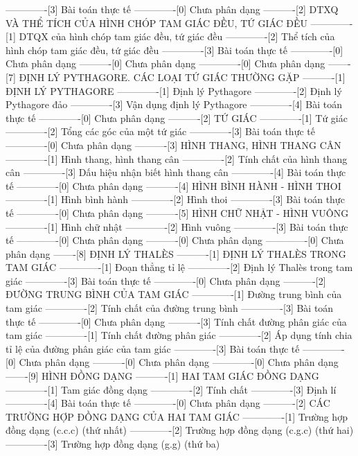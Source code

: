 -------------[3] Bài toán thực tế
-------------[0] Chưa phân dạng
----------[2] DTXQ VÀ THỂ TÍCH CỦA HÌNH CHÓP TAM GIÁC ĐỀU, TỨ GIÁC ĐỀU
-------------[1] DTQX của hình chóp tam giác đều, tứ giác đều
-------------[2] Thể tích của hình chóp tam giác đều, tứ giác đều
-------------[3] Bài toán thực tế
-------------[0] Chưa phân dạng
----------[0] Chưa phân dạng
-------------[0] Chưa phân dạng
-------[7] ĐỊNH LÝ PYTHAGORE. CÁC LOẠI TỨ GIÁC THƯỜNG GẶP
----------[1] ĐỊNH LÝ PYTHAGORE
-------------[1] Định lý Pythagore
-------------[2] Định lý Pythagore đảo
-------------[3] Vận dụng định lý Pythagore
-------------[4] Bài toán thực tế
-------------[0] Chưa phân dạng
----------[2] TỨ GIÁC
-------------[1] Tứ giác
-------------[2] Tổng các góc của một tứ giác
-------------[3] Bài toán thực tế
-------------[0] Chưa phân dạng
----------[3] HÌNH THANG, HÌNH THANG CÂN
-------------[1] Hình thang, hình thang cân
-------------[2] Tính chất của hình thang cân
-------------[3] Dấu hiệu nhận biết hình thang cân
-------------[4] Bài toán thực tế
-------------[0] Chưa phân dạng
----------[4] HÌNH BÌNH HÀNH - HÌNH THOI
-------------[1] Hình bình hành
-------------[2] Hình thoi
-------------[3] Bài toán thực tế
-------------[0] Chưa phân dạng
----------[5] HÌNH CHỮ NHẬT - HÌNH VUÔNG
-------------[1] Hình chữ nhật
-------------[2] Hình vuông
-------------[3] Bài toán thực tế
-------------[0] Chưa phân dạng
----------[0] Chưa phân dạng
-------------[0] Chưa phân dạng
-------[8] ĐỊNH LÝ THALÈS
----------[1] ĐỊNH LÝ THALÈS TRONG TAM GIÁC
-------------[1] Đoạn thẳng tỉ lệ
-------------[2] Định lý Thalès trong tam giác
-------------[3] Bài toán thực tế
-------------[0] Chưa phân dạng
----------[2] ĐƯỜNG TRUNG BÌNH CỦA TAM GIÁC
-------------[1] Đường trung bình của tam giác
-------------[2] Tính chất của đường trung bình
-------------[3] Bài toán thực tế
-------------[0] Chưa phân dạng
----------[3] Tính chất đường phân giác của tam giác
-------------[1] Tính chất đường phân giác
-------------[2] Áp dụng tính chia tỉ lệ của đường phân giác của tam giác
-------------[3] Bài toán thực tế
-------------[0] Chưa phân dạng
----------[0] Chưa phân dạng
-------------[0] Chưa phân dạng
-------[9] HÌNH ĐỒNG DẠNG
----------[1] HAI TAM GIÁC ĐỒNG DẠNG
-------------[1] Tam giác đồng dạng
-------------[2] Tính chất
-------------[3] Định lí
-------------[4] Bài toán thực tế
-------------[0] Chưa phân dạng
----------[2] CÁC TRƯỜNG HỢP ĐỒNG DẠNG CỦA HAI TAM GIÁC
-------------[1] Trường hợp đồng dạng (c.c.c) (thứ nhất)
-------------[2] Trường hợp đồng dạng (c.g.c) (thứ hai)
-------------[3] Trường hợp đồng dạng (g.g) (thứ ba)
